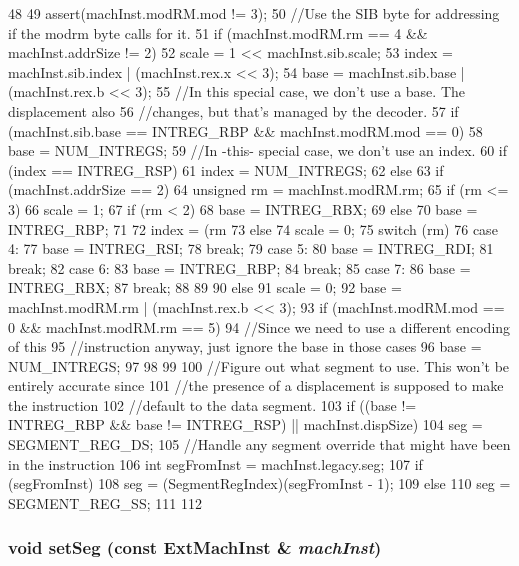 \begin{DoxyCode}
48 {
49     assert(machInst.modRM.mod != 3);
50     //Use the SIB byte for addressing if the modrm byte calls for it.
51     if (machInst.modRM.rm == 4 && machInst.addrSize != 2) {
52         scale = 1 << machInst.sib.scale;
53         index = machInst.sib.index | (machInst.rex.x << 3);
54         base = machInst.sib.base | (machInst.rex.b << 3);
55         //In this special case, we don't use a base. The displacement also
56         //changes, but that's managed by the decoder.
57         if (machInst.sib.base == INTREG_RBP && machInst.modRM.mod == 0)
58             base = NUM_INTREGS;
59         //In -this- special case, we don't use an index.
60         if (index == INTREG_RSP)
61             index = NUM_INTREGS;
62     } else {
63         if (machInst.addrSize == 2) {
64             unsigned rm = machInst.modRM.rm;
65             if (rm <= 3) {
66                 scale = 1;
67                 if (rm < 2) {
68                     base = INTREG_RBX;
69                 } else {
70                     base = INTREG_RBP;
71                 }
72                 index = (rm %
73             } else {
74                 scale = 0;
75                 switch (rm) {
76                   case 4:
77                     base = INTREG_RSI;
78                     break;
79                   case 5:
80                     base = INTREG_RDI;
81                     break;
82                   case 6:
83                     base = INTREG_RBP;
84                     break;
85                   case 7:
86                     base = INTREG_RBX;
87                     break;
88                 }
89             }
90         } else {
91             scale = 0;
92             base = machInst.modRM.rm | (machInst.rex.b << 3);
93             if (machInst.modRM.mod == 0 && machInst.modRM.rm == 5) {
94                 //Since we need to use a different encoding of this
95                 //instruction anyway, just ignore the base in those cases
96                 base = NUM_INTREGS;
97             }
98         }
99     }
100     //Figure out what segment to use. This won't be entirely accurate since
101     //the presence of a displacement is supposed to make the instruction
102     //default to the data segment.
103     if ((base != INTREG_RBP && base != INTREG_RSP) || machInst.dispSize) {
104         seg = SEGMENT_REG_DS;
105         //Handle any segment override that might have been in the instruction
106         int segFromInst = machInst.legacy.seg;
107         if (segFromInst)
108             seg = (SegmentRegIndex)(segFromInst - 1);
109     } else {
110         seg = SEGMENT_REG_SS;
111     }
112 }
\end{DoxyCode}
\hypertarget{structX86ISA_1_1EmulEnv_a1551fe2bf04bbf608dbcf23167211192}{
\subsubsection[{setSeg}]{\setlength{\rightskip}{0pt plus 5cm}void setSeg (const {\bf ExtMachInst} \& {\em machInst})}}
\label{structX86ISA_1_1EmulEnv_a1551fe2bf04bbf608dbcf23167211192}




